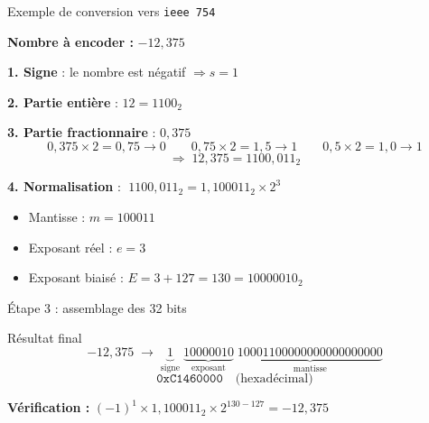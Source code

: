 \begin{frame}{Exemple de conversion  vers \texttt{ieee 754}}

  \textbf{Nombre à encoder :} $-12{,}375$

  \vspace{0.3cm}
  \textbf{1. Signe} \; : le nombre est négatif $\Rightarrow s = 1$

  \vspace{0.3cm}
  \textbf{2. Partie entière} \; : $12 = 1100_2$

  \vspace{0.3cm}
  \textbf{3. Partie fractionnaire} \; : $0{,}375$
  \[
    0{,}375 \times 2 = 0{,}75 \rightarrow 0 \qquad
    0{,}75 \times 2 = 1{,}5 \rightarrow 1 \qquad
    0{,}5 \times 2 = 1{,}0 \rightarrow 1
  \]
  \[
    \Rightarrow\; 12{,}375 = 1100{,}011_2
  \]

  \vspace{0.3cm}
  \textbf{4. Normalisation} \; : $\;1100{,}011_2 = 1{,}100011_2 \times 2^{3}$
  \begin{itemize}
    \item Mantisse : $m = 100011$
    \item Exposant réel : $e = 3$
    \item Exposant biaisé : $E = 3 + 127 = 130 = 10000010_2$
  \end{itemize}
\end{frame}

\begin{frame}{Étape 3 : assemblage des 32 bits}

  \begin{center}
  \end{center}

  \vspace{0.4cm}
  \begin{block}{Résultat final}
    \[
      -12{,}375 \;\longrightarrow\;
      \underbrace{1}_{\text{signe}}\;
      \underbrace{10000010}_{\text{exposant}}\;
      \underbrace{10001100000000000000000}_{\text{mantisse}}
    \]
    \[
      \boxed{\texttt{0xC1460000}} \quad \text{(hexadécimal)}
    \]
  \end{block}

  \vspace{0.3cm}
  \textbf{Vérification :} $(-1)^1 \times 1{,}100011_2 \times 2^{130-127} = -12{,}375$ \checkmark
\end{frame}

